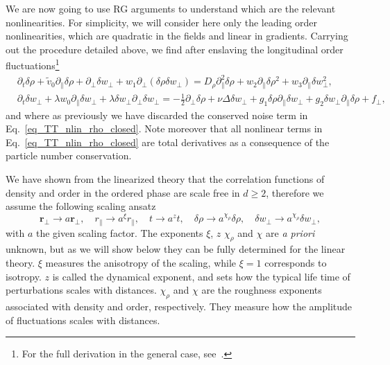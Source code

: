 We are now going to use RG arguments to understand which are the relevant nonlinearities. For simplicity, we will consider here only the leading order nonlinearities, which are quadratic in the fields and linear in gradients. 
Carrying out the procedure detailed above, we find after enslaving the longitudinal order fluctuations\footnote{For the full derivation in the general case, see~\cite{toner2012reanalysis}.}
\begin{subequations}
\label{eq_TT_nlin_closed}
\begin{align}
\label{eq_TT_nlin_rho_closed}
&\partial_t \delta \rho + \tilde{v}_0\partial_\| \delta \rho + \partial_\perp \delta w_\perp + w_1 \partial_\perp( \delta \rho \delta w_\perp ) = 
D_\rho \partial_\|^2 \delta\rho + w_2\partial_\|  \delta \rho^2 + w_3 \partial_\|  \delta w_\perp^2 , \\
\label{eq_TT_nlin_perp_closed}
&\partial_t \delta w_\perp + \lambda w_0  \partial_\| \delta w_\perp + \lambda\delta w_\perp  \partial_\perp \delta w_\perp =  
- \frac{1}{2}\partial_\perp \delta \rho + \nu \Delta \delta w_\perp + g_1 \delta \rho \partial_\|  \delta w_\perp + g_2\delta w_\perp\partial_\|\delta \rho  + f_\perp,
\end{align}
\end{subequations}
and where as previously we have discarded the conserved noise term in Eq.~\eqref{eq_TT_nlin_rho_closed}.
Note moreover that all nonlinear terms in Eq.~\eqref{eq_TT_nlin_rho_closed} are total derivatives as a consequence of the particle number conservation.

We have shown from the linearized theory that the correlation functions of density and order in the ordered phase are scale free in $d\ge 2$,
therefore 
we assume the following scaling ansatz
\begin{equation} \label{eq_rescaling}
\bm r_\perp \to a \bm r_\perp , \quad r_\| \to a^\xi r_\| , \quad t \to a^z t , \quad \delta\rho \to a^{\chi_\rho}\delta\rho , \quad \delta w_\perp \to a^{\chi_\rho}\delta w_\perp ,
\end{equation}
with $a$ the given scaling factor.
The exponents $\xi$, $z$ $\chi_\rho$ and $\chi$ are {\it a priori} unknown, but as we will show below they can be fully determined for the linear theory.
$\xi$ measures the anisotropy of the scaling, while $\xi = 1$ corresponds to isotropy.
$z$ is called the dynamical exponent, and sets how the typical life time of perturbations scales with distances. 
$\chi_\rho$ and $\chi$ are the roughness exponents associated with density and order, respectively. 
They measure how the amplitude of fluctuations scales with distances. 

